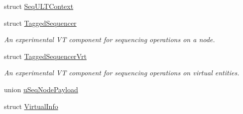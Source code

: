 \begin{DoxyCompactItemize}
struct \hyperlink{structvt_1_1seq_1_1_seq_u_l_t_context}{Seq\+U\+L\+T\+Context}
\item 
struct \hyperlink{structvt_1_1seq_1_1_tagged_sequencer}{Tagged\+Sequencer}
\begin{DoxyCompactList}\small\item\em An experimental VT component for sequencing operations on a node. \end{DoxyCompactList}\item 
struct \hyperlink{structvt_1_1seq_1_1_tagged_sequencer_vrt}{Tagged\+Sequencer\+Vrt}
\begin{DoxyCompactList}\small\item\em An experimental VT component for sequencing operations on virtual entities. \end{DoxyCompactList}\item 
union \hyperlink{unionvt_1_1seq_1_1u_seq_node_payload}{u\+Seq\+Node\+Payload}
\item 
struct \hyperlink{structvt_1_1seq_1_1_virtual_info}{Virtual\+Info}
\end{DoxyCompactItemize}
